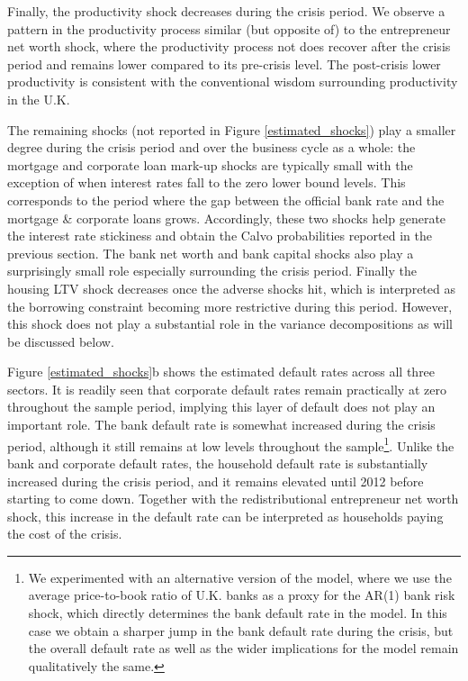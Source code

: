 \documentclass[12pt]{article}
\numberwithin{equation}{section}
\begin{document}
Finally, the productivity shock decreases during the crisis period. We observe a pattern in the productivity process similar (but opposite of) to the entrepreneur net worth shock, where the productivity process not does recover after the crisis period and remains lower compared to its pre-crisis level. The post-crisis lower productivity is consistent with the conventional wisdom surrounding productivity in the U.K. 

The remaining shocks (not reported in Figure \ref{estimated_shocks}) play a smaller degree during the crisis period and over the business cycle as a whole: the mortgage and corporate loan mark-up shocks are typically small with the exception of when interest rates fall to the zero lower bound levels. This corresponds to the period where the gap between the official bank rate and the mortgage \& corporate loans grows. Accordingly, these two shocks help generate the interest rate stickiness and obtain the Calvo probabilities reported in the previous section. The bank net worth and bank capital shocks also play a surprisingly small role especially surrounding the crisis period. Finally the housing LTV shock decreases once the adverse shocks hit, which is interpreted as the borrowing constraint becoming more restrictive during this period. However, this shock does not play a substantial role in the variance decompositions as will be discussed below. 


Figure \ref{estimated_shocks}b shows the estimated default rates across all three sectors. It is readily seen that corporate default rates remain practically at zero throughout the sample period, implying this layer of default does not play an important role. The bank default rate is somewhat increased during the crisis period, although it still remains at low levels throughout the sample\footnote{We experimented with an alternative version of the model, where we use the average price-to-book ratio of U.K. banks as a proxy for the AR(1) bank risk shock, which directly determines the bank default rate in the model. In this case we obtain a sharper jump in the bank default rate during the crisis, but the overall default rate as well as the wider implications for the model remain qualitatively the same.}. Unlike the bank and corporate default rates, the household default rate is substantially increased during the crisis period, and it remains elevated until 2012 before starting to come down. Together with the redistributional entrepreneur net worth shock, this increase in the default rate can be interpreted as households paying the cost of the crisis. 
\end{document}
